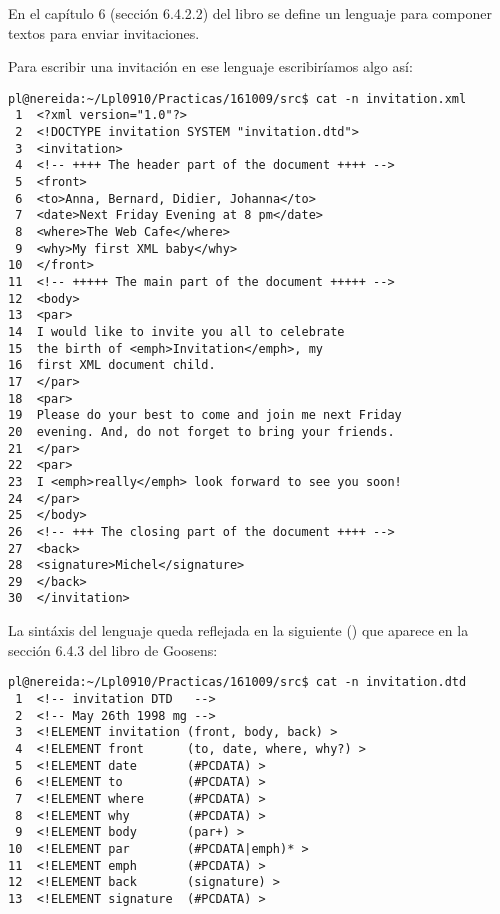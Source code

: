 \label{practica:invitaciones}

En el capítulo 6 (sección 6.4.2.2) del libro 
se define un lenguaje para componer textos para enviar invitaciones.

Para escribir una invitación en ese lenguaje escribiríamos algo así:

\begin{verbatim}
pl@nereida:~/Lpl0910/Practicas/161009/src$ cat -n invitation.xml
 1  <?xml version="1.0"?>
 2  <!DOCTYPE invitation SYSTEM "invitation.dtd">
 3  <invitation>
 4  <!-- ++++ The header part of the document ++++ -->
 5  <front>
 6  <to>Anna, Bernard, Didier, Johanna</to>
 7  <date>Next Friday Evening at 8 pm</date>
 8  <where>The Web Cafe</where>
 9  <why>My first XML baby</why>
10  </front>
11  <!-- +++++ The main part of the document +++++ -->
12  <body>
13  <par>
14  I would like to invite you all to celebrate
15  the birth of <emph>Invitation</emph>, my
16  first XML document child.
17  </par>
18  <par>
19  Please do your best to come and join me next Friday
20  evening. And, do not forget to bring your friends.
21  </par>
22  <par>
23  I <emph>really</emph> look forward to see you soon!
24  </par>
25  </body>
26  <!-- +++ The closing part of the document ++++ -->
27  <back>
28  <signature>Michel</signature>
29  </back>
30  </invitation>
\end{verbatim}

La sintáxis del lenguaje queda reflejada en la siguiente 
 () que aparece en la sección 6.4.3
del libro de Goosens:

\begin{verbatim}
pl@nereida:~/Lpl0910/Practicas/161009/src$ cat -n invitation.dtd
 1  <!-- invitation DTD   -->
 2  <!-- May 26th 1998 mg -->
 3  <!ELEMENT invitation (front, body, back) >
 4  <!ELEMENT front      (to, date, where, why?) >
 5  <!ELEMENT date       (#PCDATA) >
 6  <!ELEMENT to         (#PCDATA) >
 7  <!ELEMENT where      (#PCDATA) >
 8  <!ELEMENT why        (#PCDATA) >
 9  <!ELEMENT body       (par+) >
10  <!ELEMENT par        (#PCDATA|emph)* >
11  <!ELEMENT emph       (#PCDATA) >
12  <!ELEMENT back       (signature) >
13  <!ELEMENT signature  (#PCDATA) >
\end{verbatim}

